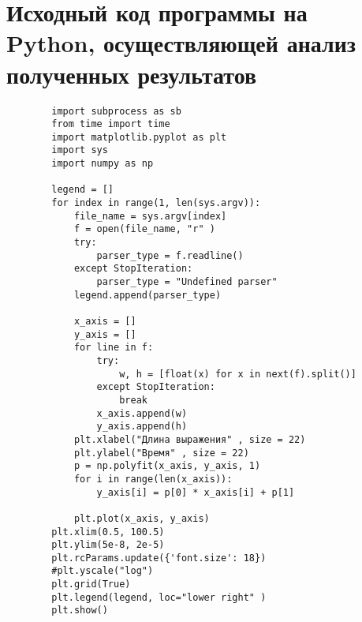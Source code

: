 \documentclass[bachelor, och, coursework]{SCWorks}
\begin{document}
    \section{Исходный код программы на Python, осуществляющей анализ полученных результатов}\label{В}
    \begin{verbatim}
        import subprocess as sb
        from time import time
        import matplotlib.pyplot as plt
        import sys
        import numpy as np
        
        legend = []
        for index in range(1, len(sys.argv)):
            file_name = sys.argv[index]
            f = open(file_name, "r" )
            try:
                parser_type = f.readline()
            except StopIteration:
                parser_type = "Undefined parser"
            legend.append(parser_type)

            x_axis = []
            y_axis = []
            for line in f:
                try:
                    w, h = [float(x) for x in next(f).split()]
                except StopIteration:
                    break
                x_axis.append(w)
                y_axis.append(h)
            plt.xlabel("Длина выражения" , size = 22)
            plt.ylabel("Время" , size = 22)
            p = np.polyfit(x_axis, y_axis, 1)
            for i in range(len(x_axis)):
                y_axis[i] = p[0] * x_axis[i] + p[1]

            plt.plot(x_axis, y_axis)
        plt.xlim(0.5, 100.5)
        plt.ylim(5e-8, 2e-5)
        plt.rcParams.update({'font.size': 18})
        #plt.yscale("log")
        plt.grid(True)
        plt.legend(legend, loc="lower right" )
        plt.show()
    \end{verbatim}

    \signatureline
\end{document}
